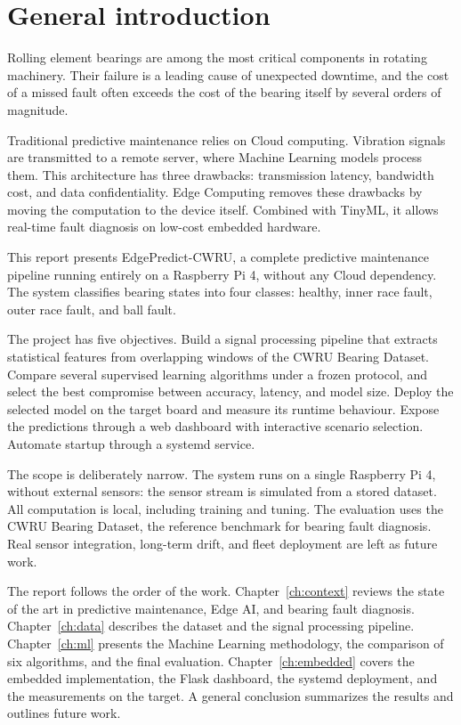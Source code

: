 \chapter*{General introduction}

\noindent
Rolling element bearings are among the most critical components in rotating machinery. Their failure is a leading cause of unexpected downtime, and the cost of a missed fault often exceeds the cost of the bearing itself by several orders of magnitude.

Traditional predictive maintenance relies on Cloud computing. Vibration signals are transmitted to a remote server, where Machine Learning models process them. This architecture has three drawbacks: transmission latency, bandwidth cost, and data confidentiality. Edge Computing removes these drawbacks by moving the computation to the device itself. Combined with TinyML, it allows real-time fault diagnosis on low-cost embedded hardware.

This report presents EdgePredict-CWRU, a complete predictive maintenance pipeline running entirely on a Raspberry Pi 4, without any Cloud dependency. The system classifies bearing states into four classes: healthy, inner race fault, outer race fault, and ball fault.

The project has five objectives. Build a signal processing pipeline that extracts statistical features from overlapping windows of the CWRU Bearing Dataset. Compare several supervised learning algorithms under a frozen protocol, and select the best compromise between accuracy, latency, and model size. Deploy the selected model on the target board and measure its runtime behaviour. Expose the predictions through a web dashboard with interactive scenario selection. Automate startup through a systemd service.

The scope is deliberately narrow. The system runs on a single Raspberry Pi 4, without external sensors: the sensor stream is simulated from a stored dataset. All computation is local, including training and tuning. The evaluation uses the CWRU Bearing Dataset, the reference benchmark for bearing fault diagnosis. Real sensor integration, long-term drift, and fleet deployment are left as future work.

The report follows the order of the work. Chapter~\ref{ch:context} reviews the state of the art in predictive maintenance, Edge AI, and bearing fault diagnosis. Chapter~\ref{ch:data} describes the dataset and the signal processing pipeline. Chapter~\ref{ch:ml} presents the Machine Learning methodology, the comparison of six algorithms, and the final evaluation. Chapter~\ref{ch:embedded} covers the embedded implementation, the Flask dashboard, the systemd deployment, and the measurements on the target. A general conclusion summarizes the results and outlines future work.